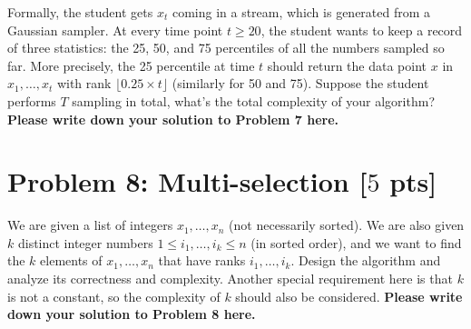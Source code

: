 \documentclass[letterpaper, 11pt]{article}
\newcommand{\1}{\mathds{1}}	%
\theoremstyle{definition}
\newcommand{\problem}[1]{\section*{Problem #1}}
\newenvironment{solution}{{\par\noindent\it Solution.}}{}
\begin{document}
Formally, the student gets $x_t$ coming in a stream, which is generated from a Gaussian sampler. At every time point $t \geq 20$, the student wants to keep a record of three statistics: the 25, 50, and 75 percentiles of all the numbers sampled so far. More precisely, the 25 percentile at time $t$ should return the data point $x$ in $x_1, \ldots, x_t$ with rank $\lfloor 0.25 \times t \rfloor$ (similarly for 50 and 75). Suppose the student performs $T$ sampling in total, what's the total complexity of your algorithm?
\begin{solution}
\textbf{Please write down your solution to Problem 7 here.}
\end{solution}
\newpage


\problem{8: Multi-selection [$5$ pts]}
We are given a list of integers $x_1, \ldots, x_n$ (not necessarily sorted). We are also given $k$ distinct integer numbers $1\leq i_1, \ldots, i_k \leq n$ (in sorted order), and we want to find the $k$ elements of $x_1, \ldots, x_n$ that have ranks $i_1, \ldots, i_k$. Design the algorithm and analyze its correctness and complexity. Another special requirement here is that $k$ is not a constant, so the complexity of $k$ should also be considered.
\begin{solution}
\textbf{Please write down your solution to Problem 8 here.}
\end{solution}
\end{document}
